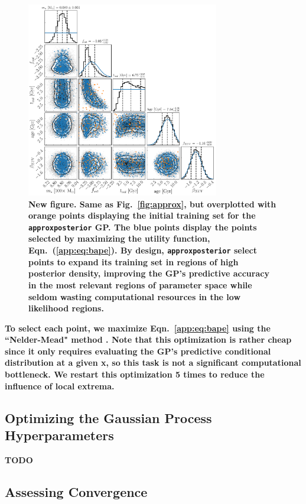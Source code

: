 \documentclass[twocolumn]{aastex62}
\newcommand{\xxx}[1]{{\textbf{#1}}}
\newcommand{\approxposterior}[0]{\texttt{approxposterior}\xspace}
\begin{document}
\begin{figure}[t]
\centering
	\includegraphics[width=0.75\textwidth]{../Analysis/Validation/points.pdf}
   \caption{\xxx{New figure. Same as Fig.~\ref{fig:approx}, but overplotted with orange points displaying the initial training set for the \approxposterior GP. The blue points display the points selected by maximizing the \citet{Kandasamy2017} utility function, Eqn.~(\ref{app:eq:bape}). By design, \approxposterior select points to expand its training set in regions of high posterior density, improving the GP's predictive accuracy in the most relevant regions of parameter space while seldom wasting computational resources in the low likelihood regions.}}%
    \label{fig:points}%
\end{figure}

\xxx{To select each point, we maximize Eqn.~\ref{app:eq:bape} using the ``Nelder-Mead" method \citep{Nelder1965}. Note that this optimization is rather cheap since it only requires evaluating the GP's predictive conditional distribution at a given \textbf{x}, so this task is not a significant computational bottleneck. We restart this optimization 5 times to reduce the influence of local extrema.}

\subsection{Optimizing the Gaussian Process Hyperparameters} \label{sec:app:gp}

\xxx{TODO}

\subsection{Assessing Convergence} \label{sec:app:convergence}
\end{document}
